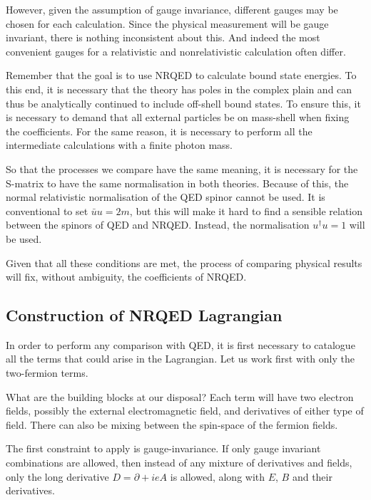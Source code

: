 However, given the assumption of gauge invariance, different gauges may be chosen for each calculation.  Since the physical measurement will be gauge invariant, there is nothing inconsistent about this.  And indeed the most convenient gauges for a relativistic and nonrelativistic calculation often differ.

Remember that the goal is to use NRQED to calculate bound state energies.  To this end, it is necessary that the theory has poles in the complex plain and can thus be analytically continued to include off-shell bound states.  To ensure this, it is necessary to demand that all external particles be on mass-shell when fixing the coefficients.  For the same reason, it is necessary to perform all the intermediate calculations with a finite photon mass.  

 
So that the processes we compare have the same meaning, it is necessary for the S-matrix to have the same normalisation in both theories.  Because of this, the normal relativistic normalisation of the QED spinor cannot be used.  It is conventional to set $\bar{u} u = 2m$, but this will make it hard to find a sensible relation between the spinors of QED and NRQED.  Instead, the normalisation $u^\dagger u = 1$ will be used.

Given that all these conditions are met, the process of comparing physical results will fix, without ambiguity, the coefficients of NRQED.   

\subsection{Construction of NRQED Lagrangian}

In order to perform any comparison with QED, it is first necessary to catalogue all the terms that could arise in the Lagrangian.  Let us work first with only the two-fermion terms.

What are the building blocks at our disposal?  Each term will have two electron fields, possibly the external electromagnetic field, and derivatives of either type of field.  There can also be mixing between the spin-space of the fermion fields.

The first constraint to apply is gauge-invariance.  If only gauge invariant combinations are allowed, then instead of any mixture of derivatives and fields, only the long derivative $D = \partial + ieA$ is allowed, along with $E$, $B$ and their derivatives.


